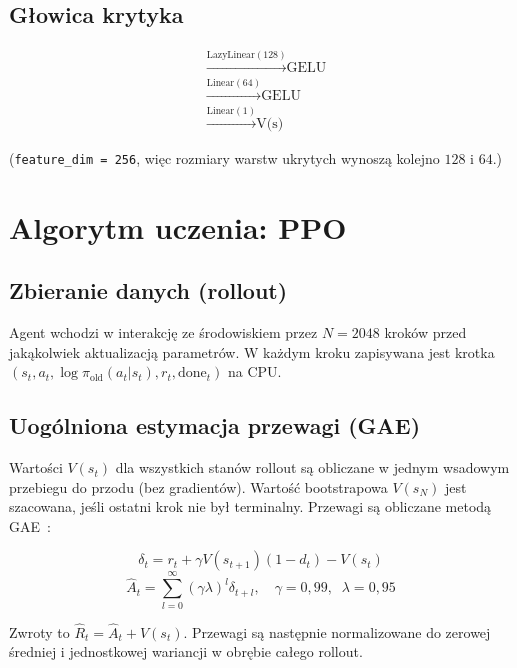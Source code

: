 \documentclass[12pt,a4paper,twocolumn]{article}
\begin{document}
\subsection{Głowica krytyka}

\[
\begin{aligned}
  &\xrightarrow{\text{LazyLinear}(128)} \text{GELU} \\
  &\xrightarrow{\text{Linear}(64)} \text{GELU} \\
  &\xrightarrow{\text{Linear}(1)} \text{V(s)}
\end{aligned}
\]

(\texttt{feature\_dim = 256}, więc rozmiary warstw ukrytych wynoszą kolejno $128$ i $64$.)

\section{Algorytm uczenia: PPO}

\subsection{Zbieranie danych (rollout)}

Agent wchodzi w interakcję ze środowiskiem przez $N = 2048$ kroków przed jakąkolwiek aktualizacją parametrów.
W każdym kroku zapisywana jest krotka $(s_t, a_t, \log\pi_\text{old}(a_t|s_t), r_t, \text{done}_t)$ na CPU.

\subsection{Uogólniona estymacja przewagi (GAE)}

Wartości $V(s_t)$ dla wszystkich stanów rollout są obliczane w jednym wsadowym przebiegu do przodu (bez gradientów).
Wartość bootstrapowa $V(s_N)$ jest szacowana, jeśli ostatni krok nie był terminalny.
Przewagi są obliczane metodą GAE~\cite{schulman2015high}:

\begin{equation}
  \delta_t = r_t + \gamma V(s_{t+1})(1-d_t) - V(s_t)
\end{equation}
\begin{equation}
  \hat{A}_t = \sum_{l=0}^{\infty} (\gamma\lambda)^l \delta_{t+l},
  \quad \gamma = 0{,}99,\;\; \lambda = 0{,}95
\end{equation}

Zwroty to $\hat{R}_t = \hat{A}_t + V(s_t)$.
Przewagi są następnie normalizowane do zerowej średniej i jednostkowej wariancji w obrębie całego rollout.
\end{document}
